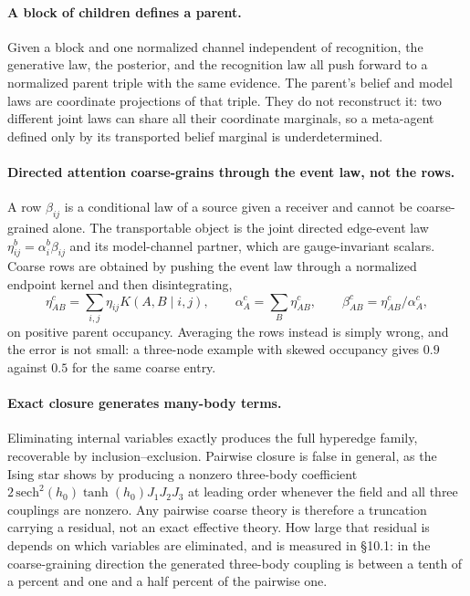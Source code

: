 \documentclass[11pt,letterpaper]{article}
\begin{document}
\paragraph{A block of children defines a parent.} Given a block and one normalized
channel independent of recognition, the generative law, the posterior, and the
recognition law all push forward to a normalized parent triple with the same
evidence. The parent's belief and model laws are coordinate projections of that
triple. They do not reconstruct it: two different joint laws can share all their
coordinate marginals, so a meta-agent defined only by its transported belief
marginal is underdetermined.

\paragraph{Directed attention coarse-grains through the event law, not the rows.}
A row $\beta_{ij}$ is a conditional law of a source given a receiver and cannot be
coarse-grained alone. The transportable object is the joint directed edge-event law
$\eta^b_{ij} = \alpha^b_i \beta_{ij}$ and its model-channel partner, which are
gauge-invariant scalars. Coarse rows are obtained by pushing the event law through a
normalized endpoint kernel and then disintegrating,
\begin{equation}
\eta^{c}_{AB} = \sum_{i,j} \eta_{ij} K(A,B \mid i,j),
\qquad
\alpha^c_A = \sum_B \eta^c_{AB},
\qquad
\beta^c_{AB} = \eta^c_{AB} / \alpha^c_A ,
\end{equation}
on positive parent occupancy. Averaging the rows instead is simply wrong, and the
error is not small: a three-node example with skewed occupancy gives $0.9$ against
$0.5$ for the same coarse entry.

\paragraph{Exact closure generates many-body terms.} Eliminating internal variables
exactly produces the full hyperedge family, recoverable by inclusion--exclusion.
Pairwise closure is false in general, as the Ising star shows by producing a nonzero
three-body coefficient $2\,\mathrm{sech}^2(h_0)\tanh(h_0) J_1 J_2 J_3$ at leading
order whenever the field and all three couplings are nonzero. Any pairwise coarse
theory is therefore a truncation carrying a residual, not an exact effective theory.
How large that residual is depends on which variables are eliminated, and is
measured in \S10.1: in the coarse-graining direction the generated three-body
coupling is between a tenth of a percent and one and a half percent of the pairwise
one.
\end{document}
